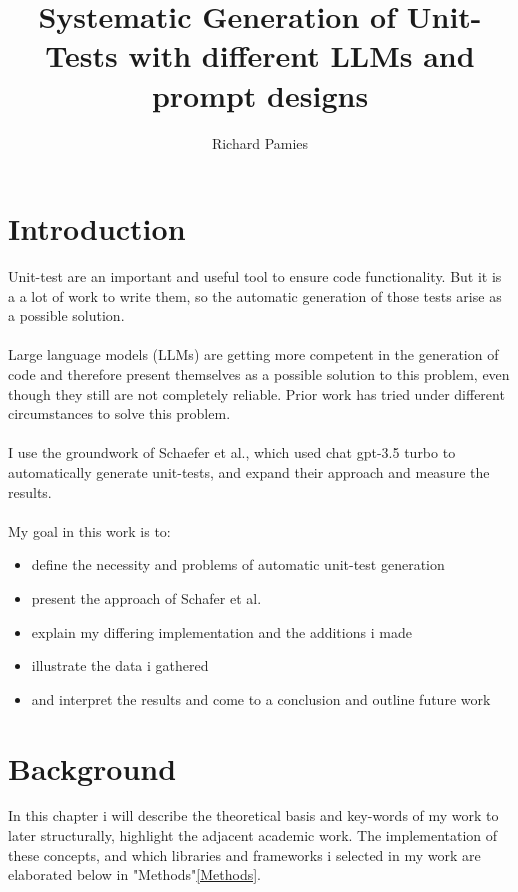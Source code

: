 \documentclass[a4paper,11pt,oneside]{memoir}
\title{Systematic Generation of Unit-Tests with different LLMs and prompt designs}
\author{Richard Pamies}
\begin{document}
\frontmatter

\smarttitle

\newpage
\tableofcontents

\mainmatter

\chapter{Introduction}
\label{Introduction}
Unit-test are an important and useful tool to ensure code functionality. But it is a a lot of work to write them, so the automatic generation of those tests arise as a possible solution. \\\\
Large language models (LLMs) are getting more competent in the generation of code and therefore present themselves as a possible solution to this problem, even though they still are not completely reliable.
Prior work  has tried under different circumstances to solve this problem.\\\\
I use the groundwork of Schaefer et al.\cite{Schaefer_automated_unit_test_generation}, which used chat gpt-3.5 turbo to automatically generate unit-tests, and expand their approach and measure the results.\\\\
My goal in this work is to:
\begin{itemize}
    \item define the necessity and problems of automatic unit-test generation
    \item present the approach of Schafer et al.
    \item explain my differing implementation and the additions i made
    \item illustrate the data i gathered
    \item and interpret the results and come to a conclusion and outline future work
\end{itemize}

\chapter{Background}
\label{Background}
In this chapter i will describe the theoretical basis and key-words of my work to later structurally, highlight the adjacent academic work. The implementation of these concepts, and which libraries and frameworks i selected in my work are elaborated below in "Methods"\ref{Methods}.
\end{document}
